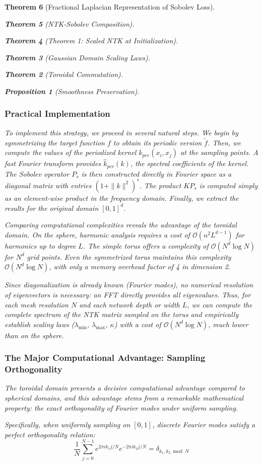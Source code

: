 \documentclass{article}
\newtheorem{theorem}{Theorem}[section]
\newtheorem{proposition}[theorem]{Proposition}
\begin{document}
\begin{theorem}[Fractional Laplacian Representation of Sobolev Loss]
\begin{theorem}[NTK-Sobolev Composition]
\begin{theorem}[Theorem 1: Scaled NTK at Initialization]
\begin{theorem}[Gaussian Domain Scaling Laws]
\begin{theorem}[Toroidal Commutation]
\begin{proposition}[Smoothness Preservation]
\subsubsection{Practical Implementation}

To implement this strategy, we proceed in several natural steps. We begin by symmetrizing the target function $f$ to obtain its periodic version $\tilde{f}$. Then, we compute the values of the periodized kernel $k_{per}(x_i, x_j)$ at the sampling points. A fast Fourier transform provides $\hat{k}_{per}(k)$, the spectral coefficients of the kernel. The Sobolev operator $P_s$ is then constructed directly in Fourier space as a diagonal matrix with entries $(1 + \|k\|^2)^s$. The product $KP_s$ is computed simply as an element-wise product in the frequency domain. Finally, we extract the results for the original domain $[0,1]^d$.

Comparing computational complexities reveals the advantage of the toroidal domain. On the sphere, harmonic analysis requires a cost of $\mathcal{O}(n^2 L^{d-1})$ for harmonics up to degree $L$. The simple torus offers a complexity of $\mathcal{O}(N^d \log N)$ for $N^d$ grid points. Even the symmetrized torus maintains this complexity $\mathcal{O}(N^d \log N)$, with only a memory overhead factor of 4 in dimension 2.

Since diagonalization is already known (Fourier modes), no numerical resolution of eigenvectors is necessary: an FFT directly provides all eigenvalues. Thus, for each mesh resolution $N$ and each network depth or width $L$, we can compute the complete spectrum of the NTK matrix sampled on the torus and empirically establish scaling laws ($\lambda_{\min}$, $\lambda_{\max}$, $\kappa$) with a cost of $\mathcal{O}(N^{d}\log N)$, much lower than on the sphere.

\subsubsection{The Major Computational Advantage: Sampling Orthogonality}

The toroidal domain presents a decisive computational advantage compared to spherical domains, and this advantage stems from a remarkable mathematical property: the exact orthogonality of Fourier modes under uniform sampling.

Specifically, when uniformly sampling on $[0,1]$, discrete Fourier modes satisfy a perfect orthogonality relation:
\[ \frac{1}{N} \sum_{j=0}^{N-1} e^{2\pi i k_1 j/N} e^{-2\pi i k_2 j/N} = \delta_{k_1, k_2 \bmod N} \]


\end{proposition}
\end{theorem}
\end{theorem}
\end{theorem}
\end{theorem}
\end{theorem}
\end{document}
